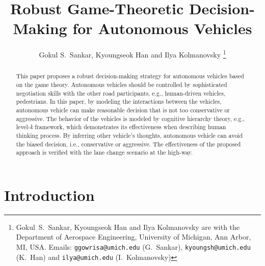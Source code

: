 \documentclass[10pt,journal]{IEEEtran}
\begin{document}
	
	\title{Robust Game-Theoretic Decision-Making for Autonomous Vehicles}

	\thispagestyle{empty}

	\author{
		Gokul S.~Sankar,  Kyoungseok Han and Ilya Kolmanovsky%
		\thanks{Gokul~S.~Sankar,  Kyoungseok Han and Ilya Kolmanovsky are with the Department of Aerospace Engineering, University of Michigan, Ann Arbor, MI, USA. Emails: {\tt\small ggowrisa@umich.edu} (G.~Sankar), 
			{\tt\small kyoungsh@umich.edu} (K.~Han) and  {\tt\small ilya@umich.edu} (I.~Kolmanovsky) }%
	}

	\maketitle
	
	
	
	\begin{abstract}
	This paper proposes a robust decision-making strategy for autonomous vehicles based on the game theory. Autonomous vehicles should be controlled by sophisticated negotiation skills with the other road participants, e.g., human-driven vehicles, pedestrians. In this paper, by modeling the interactions between the vehicles, autonomous vehicle can make reasonable decision that is not too conservative or aggressive. The behavior of the vehicles is modeled by cognitive hierarchy theory, e.g., level-\textit{k} framework, which demonstrates its effectiveness when describing human thinking process. By inferring other vehicle's thoughts, autonomous vehicle can avoid the biased decision, i.e., conservative or aggressive. The effectiveness of the proposed approach is verified with the lane change scenario at the high-way.
	
	\end{abstract}
	
	

	
	\section{Introduction}
	\label{sec:intro}
\end{document}
